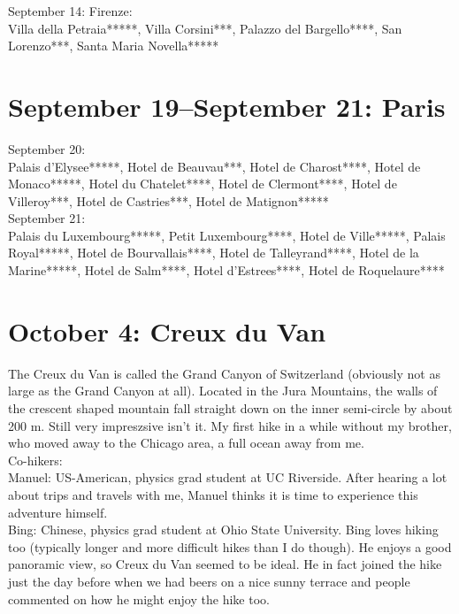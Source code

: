 September 14: Firenze:\\
Villa della Petraia*****, Villa Corsini***, Palazzo del Bargello****, San Lorenzo***, Santa Maria Novella*****

\section{September 19--September 21: Paris}
\label{Paris2014}

September 20:\\
Palais d'Elysee*****, Hotel de Beauvau***, Hotel de Charost****, Hotel de Monaco*****, Hotel du Chatelet****, Hotel de Clermont****, Hotel de Villeroy***, Hotel de Castries***, Hotel de Matignon*****\\

September 21:\\
Palais du Luxembourg*****, Petit Luxembourg****, Hotel de Ville*****, Palais Royal*****, Hotel de Bourvallais****, Hotel de Talleyrand****, Hotel de la Marine*****, Hotel de Salm****, Hotel d'Estrees****, Hotel de Roquelaure****

\section{October 4: Creux du Van}
\label{Creuxduvan2014}

The Creux du Van is called the Grand Canyon of Switzerland (obviously not as large as the Grand Canyon at all). Located in the Jura Mountains, the walls of the crescent shaped mountain fall straight down on the inner semi-circle by about 200 m. Still very impreszsive isn't it. My first hike in a while without my brother, who moved away to the Chicago area, a full ocean away from me.\\

Co-hikers:\\
Manuel: US-American, physics grad student at UC Riverside. After hearing a lot about trips and travels with me, Manuel thinks it is time to experience this adventure himself.\\
Bing: Chinese, physics grad student at Ohio State University. Bing loves hiking too (typically longer and more difficult hikes than I do though). He enjoys a good panoramic view, so Creux du Van seemed to be ideal. He in fact joined the hike just the day before when we had beers on a nice sunny terrace and people commented on how he might enjoy the hike too.\\

